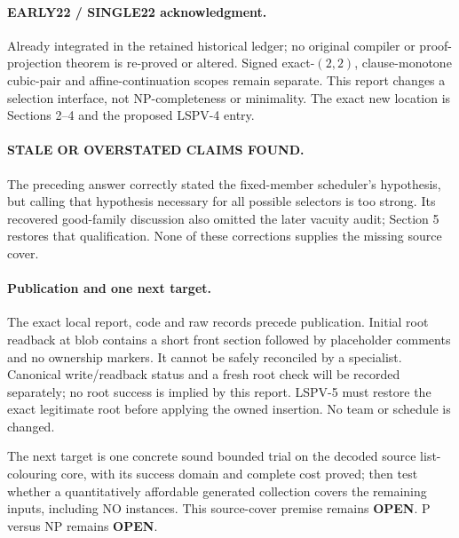 \documentclass[11pt]{article}
\begin{document}
\paragraph{EARLY22 / SINGLE22 acknowledgment.}
Already integrated in the retained historical ledger; no original compiler
or proof-projection theorem is re-proved or altered. Signed exact-$(2,2)$,
clause-monotone cubic-pair and affine-continuation scopes remain separate.
This report changes a selection interface, not NP-completeness or minimality.
The exact new location is Sections 2--4 and the proposed LSPV-4 entry.

\paragraph{STALE OR OVERSTATED CLAIMS FOUND.}
The preceding answer correctly stated the fixed-member scheduler's hypothesis,
but calling that hypothesis necessary for all possible selectors is too strong.
Its recovered good-family discussion also omitted the later vacuity audit;
Section 5 restores that qualification. None of these corrections supplies
the missing source cover.

\paragraph{Publication and one next target.}
The exact local report, code and raw records precede publication. Initial root
readback at blob  contains a
short front section followed by placeholder comments and no ownership markers.
It cannot be safely reconciled by a specialist. Canonical write/readback status
and a fresh root check will be recorded separately; no root success is implied
by this report. LSPV-5 must restore the exact legitimate root before applying
the owned insertion. No team or schedule is changed.

The next target is one concrete sound bounded trial on the decoded source
list-colouring core, with its success domain and complete cost proved; then
test whether a quantitatively affordable generated collection covers the
remaining inputs, including NO instances. This source-cover premise remains
\textbf{OPEN}. P versus NP remains \textbf{OPEN}.
\end{document}
